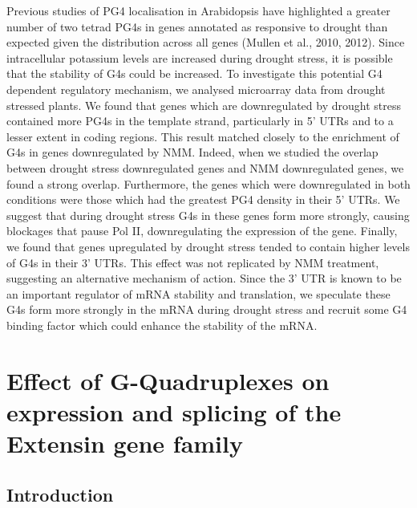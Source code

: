 \documentclass[12pt,a4paper,]{report}
\begin{document}
Previous studies of PG4 localisation in Arabidopsis have highlighted a
greater number of two tetrad PG4s in genes annotated as responsive to
drought than expected given the distribution across all genes (Mullen et
al., 2010, 2012). Since intracellular potassium levels are increased
during drought stress, it is possible that the stability of G4s could be
increased. To investigate this potential G4 dependent regulatory
mechanism, we analysed microarray data from drought stressed plants. We
found that genes which are downregulated by drought stress contained
more PG4s in the template strand, particularly in 5' UTRs and to a
lesser extent in coding regions. This result matched closely to the
enrichment of G4s in genes downregulated by NMM. Indeed, when we studied
the overlap between drought stress downregulated genes and NMM
downregulated genes, we found a strong overlap. Furthermore, the genes
which were downregulated in both conditions were those which had the
greatest PG4 density in their 5' UTRs. We suggest that during drought
stress G4s in these genes form more strongly, causing blockages that
pause Pol II, downregulating the expression of the gene. Finally, we
found that genes upregulated by drought stress tended to contain higher
levels of G4s in their 3' UTRs. This effect was not replicated by NMM
treatment, suggesting an alternative mechanism of action. Since the 3'
UTR is known to be an important regulator of mRNA stability and
translation, we speculate these G4s form more strongly in the mRNA
during drought stress and recruit some G4 binding factor which could
enhance the stability of the mRNA.

\newpage

\hypertarget{effect-of-g-quadruplexes-on-expression-and-splicing-of-the-extensin-gene-family}{%
\chapter{Effect of G-Quadruplexes on expression and splicing of the
Extensin gene
family}\label{effect-of-g-quadruplexes-on-expression-and-splicing-of-the-extensin-gene-family}}

\label{chap:extensins}

\hypertarget{introduction-4}{%
\section{Introduction}\label{introduction-4}}

\label{sec:extensin_intro}
\end{document}
